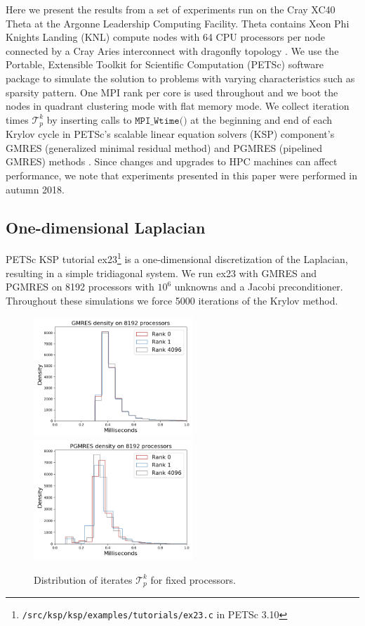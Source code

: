 \documentclass[sigconf]{acmart}
\begin{document}
Here we present the results from a set of experiments run on the Cray XC40 Theta at the Argonne Leadership Computing Facility. 
Theta contains Xeon Phi Knights Landing (KNL) compute nodes \cite{sodani2015knights} with 64 CPU processors per node connected by a Cray Aries interconnect with dragonfly topology \cite{alverson2012cray}.
We use the Portable, Extensible Toolkit for Scientific Computation (PETSc) \cite{petsc-user-ref, petsc-web-page} software package to simulate the solution to problems with varying characteristics such as sparsity pattern. 
One MPI rank per core is used throughout and we boot the nodes in quadrant clustering mode with flat memory mode. 
We collect iteration times $\mathcal{T}^k_p$ by inserting calls to ${\texttt{MPI\_Wtime()}}$ at the beginning and end of each Krylov cycle in PETSc's scalable linear equation solvers (KSP) component's GMRES (generalized minimal residual method) and PGMRES (pipelined GMRES) methods \cite[Alg. 4]{GhyselsAshbyMeerbergenVanroose2013}. 
Since changes and upgrades to HPC machines can affect performance, we note that experiments presented in this paper were performed in autumn 2018. 


\subsection{One-dimensional Laplacian} \label{sec:ex23}
PETSc KSP tutorial ex23\footnote{\texttt{/src/ksp/ksp/examples/tutorials/ex23.c} in PETSc 3.10} is a one-dimensional discretization of the Laplacian, resulting in a simple tridiagonal system. 
We run ex23 with GMRES and PGMRES on 8192 processors with $10^6$ unknowns and a Jacobi preconditioner. 
Throughout these simulations we force 5000 iterations of the Krylov method.


\begin{figure}[t]
\centering
\includegraphics[width=6cm]{../plots/GMRES_ex23_8192_1000000_identical_in_p.png}
\includegraphics[width=6cm]{../plots/PGMRES_ex23_8192_1000000_identical_in_p.png}
\caption{Distribution of iterates $\mathcal{T}^k_p$ for fixed processors.} \label{fig:ex23-identical}
\end{figure}
\end{document}
